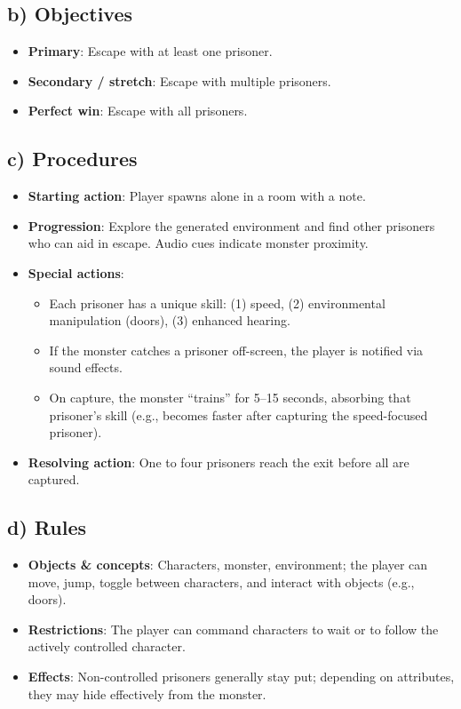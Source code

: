 \documentclass[11pt]{article}
\begin{document}
\subsection*{b) Objectives}
\begin{itemize}
  \item \textbf{Primary}: Escape with at least one prisoner.
  \item \textbf{Secondary / stretch}: Escape with multiple prisoners.
  \item \textbf{Perfect win}: Escape with all prisoners.
\end{itemize}

\subsection*{c) Procedures}
\begin{itemize}
  \item \textbf{Starting action}: Player spawns alone in a room with a note.
  \item \textbf{Progression}: Explore the generated environment and find other prisoners who can aid in escape. Audio cues indicate monster proximity.
  \item \textbf{Special actions}:
    \begin{itemize}
      \item Each prisoner has a unique skill: (1) speed, (2) environmental manipulation (doors), (3) enhanced hearing.
      \item If the monster catches a prisoner off-screen, the player is notified via sound effects.
      \item On capture, the monster ``trains'' for 5--15 seconds, absorbing that prisoner's skill (e.g., becomes faster after capturing the speed-focused prisoner).
    \end{itemize}
  \item \textbf{Resolving action}: One to four prisoners reach the exit before all are captured.
\end{itemize}

\subsection*{d) Rules}
\begin{itemize}
  \item \textbf{Objects \& concepts}: Characters, monster, environment; the player can move, jump, toggle between characters, and interact with objects (e.g., doors).
  \item \textbf{Restrictions}: The player can command characters to wait or to follow the actively controlled character.
  \item \textbf{Effects}: Non-controlled prisoners generally stay put; depending on attributes, they may hide effectively from the monster.
\end{itemize}
\end{document}
